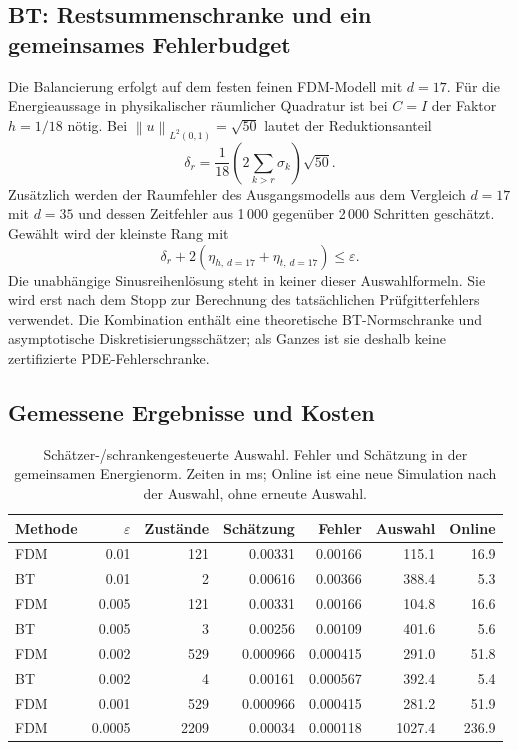 \documentclass[11pt,a4paper]{article}
\newcommand{\norm}[1]{\left\lVert#1\right\rVert}
\begin{document}
\subsection{BT: Restsummenschranke und ein gemeinsames Fehlerbudget}
Die Balancierung erfolgt auf dem festen feinen FDM-Modell mit $d=17$. Für die Energieaussage in physikalischer räumlicher Quadratur ist bei $C=I$ der Faktor $h=1/18$ nötig. Bei $\norm{u}_{L^2(0,1)}=\sqrt{50}$ lautet der Reduktionsanteil
\begin{equation}
 \delta_r=\frac1{18}\left(2\sum_{k>r}\sigma_k\right)\sqrt{50}.
\end{equation}
Zusätzlich werden der Raumfehler des Ausgangsmodells aus dem Vergleich $d=17$ mit $d=35$ und dessen Zeitfehler aus 1\,000 gegenüber 2\,000 Schritten geschätzt. Gewählt wird der kleinste Rang mit
\begin{equation}\label{eq:btstop}
 \delta_r+2(\eta_{h,\,d=17}+\eta_{t,\,d=17})\le\varepsilon.
\end{equation}
Die unabhängige Sinusreihenlösung steht in keiner dieser Auswahlformeln. Sie wird erst nach dem Stopp zur Berechnung des tatsächlichen Prüfgitterfehlers verwendet. Die Kombination enthält eine theoretische BT-Normschranke und asymptotische Diskretisierungsschätzer; als Ganzes ist sie deshalb keine zertifizierte PDE-Fehlerschranke.

\subsection{Gemessene Ergebnisse und Kosten}
\begin{table}[htbp]\centering\small
\caption{Schätzer-/schrankengesteuerte Auswahl. Fehler und Schätzung in der gemeinsamen Energienorm. Zeiten in ms; Online ist eine neue Simulation nach der Auswahl, ohne erneute Auswahl.}
\begin{tabular}{lrrrrrr}\toprule
Methode & $\varepsilon$ & Zustände & Schätzung & Fehler & Auswahl & Online\\\midrule
FDM & 0.01 & 121 & 0.00331 & 0.00166 & 115.1 & 16.9 \\
BT & 0.01 & 2 & 0.00616 & 0.00366 & 388.4 & 5.3 \\
FDM & 0.005 & 121 & 0.00331 & 0.00166 & 104.8 & 16.6 \\
BT & 0.005 & 3 & 0.00256 & 0.00109 & 401.6 & 5.6 \\
FDM & 0.002 & 529 & 0.000966 & 0.000415 & 291.0 & 51.8 \\
BT & 0.002 & 4 & 0.00161 & 0.000567 & 392.4 & 5.4 \\
FDM & 0.001 & 529 & 0.000966 & 0.000415 & 281.2 & 51.9 \\
FDM & 0.0005 & 2209 & 0.00034 & 0.000118 & 1027.4 & 236.9 \\

\bottomrule\end{tabular}
\end{table}
\end{document}

